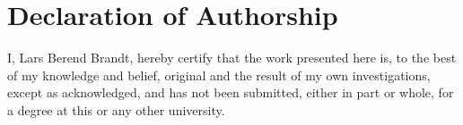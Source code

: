 \documentclass[Bachelorarbeit.tex]{subfiles}
\begin{document}
\section*{Declaration of Authorship}


I, Lars Berend Brandt, hereby certify that the work presented here is, to the best of my knowledge
and belief, original and the result of my own investigations, except as acknowledged, and has
not been submitted, either in part or whole, for a degree at this or any other university.

\vspace{3cm}

\noindent \sigdate{} 
\end{document}
